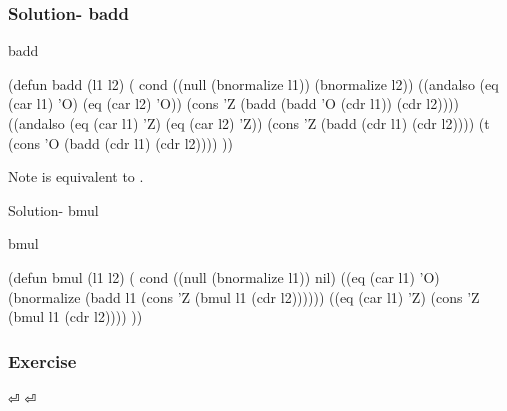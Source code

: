\documentclass[fleqn]{beamer}
\begin{document}
\begin{frame}[fragile]
\frametitle{Solution- badd}
\begin{block}{badd}
  \begin{LISP}
(defun badd (l1 l2) (
  cond
    ((null (bnormalize l1)) (bnormalize l2))
    ((andalso (eq (car l1) 'O) (eq (car l2) 'O))
      (cons 'Z (badd (badd 'O (cdr l1)) (cdr l2))))
    ((andalso (eq (car l1) 'Z) (eq (car l2) 'Z))
      (cons 'Z (badd (cdr l1) (cdr l2))))
    (t (cons 'O (badd (cdr l1) (cdr l2))))
))
    \end{LISP}
\end{block}

\begin{block}{Note}
   is equivalent to .
\end{block}
\end{frame}


\begin{frame}[fragile]{Solution- bmul}
\begin{block}{bmul}
  \begin{LISP}
(defun bmul (l1 l2) (
  cond
    ((null (bnormalize l1)) nil)
    ((eq (car l1) 'O)
      (bnormalize
        (badd l1 (cons 'Z (bmul l1 (cdr l2))))))
    ((eq (car l1) 'Z) (cons 'Z (bmul l1 (cdr l2))))
))
    \end{LISP}
\end{block}
\end{frame}

\begin{frame}
\frametitle{Exercise}
⏎
⏎
\end{frame}
\end{document}
